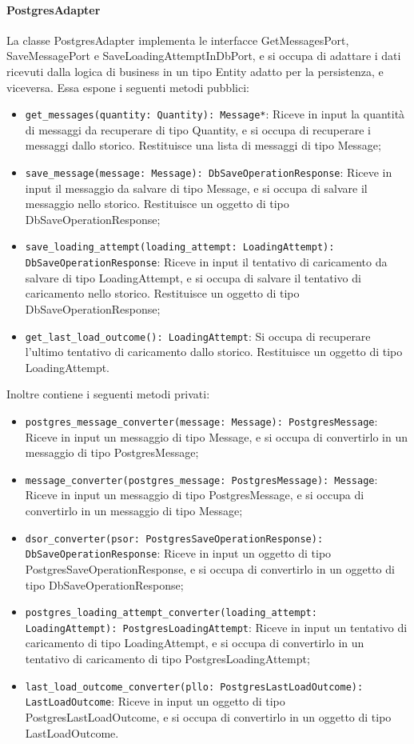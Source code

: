 \paragraph{PostgresAdapter}
\label{sec:postgres_adapter}
La classe PostgresAdapter implementa le interfacce GetMessagesPort, SaveMessagePort e SaveLoadingAttemptInDbPort, e si occupa di adattare i dati ricevuti dalla logica di business in un tipo Entity adatto per la persistenza, e viceversa. Essa espone i seguenti metodi pubblici:
\begin{itemize}
    \item \texttt{get\_messages(quantity: Quantity): Message*}: Riceve in input la quantità di messaggi da recuperare di tipo Quantity, e si occupa di recuperare i messaggi dallo storico. Restituisce una lista di messaggi di tipo Message;
    \item \texttt{save\_message(message: Message): DbSaveOperationResponse}: Riceve in input il messaggio da salvare di tipo Message, e si occupa di salvare il messaggio nello storico. Restituisce un oggetto di tipo DbSaveOperationResponse;
    \item \texttt{save\_loading\_attempt(loading\_attempt: LoadingAttempt): DbSaveOperationResponse}: Riceve in input il tentativo di caricamento da salvare di tipo LoadingAttempt, e si occupa di salvare il tentativo di caricamento nello storico. Restituisce un oggetto di tipo DbSaveOperationResponse;
    \item \texttt{get\_last\_load\_outcome(): LoadingAttempt}: Si occupa di recuperare l'ultimo tentativo di caricamento dallo storico. Restituisce un oggetto di tipo LoadingAttempt.
\end{itemize}
Inoltre contiene i seguenti metodi privati:
\begin{itemize}
    \item \texttt{postgres\_message\_converter(message: Message): PostgresMessage}: Riceve in input un messaggio di tipo Message, e si occupa di convertirlo in un messaggio di tipo PostgresMessage;
    \item \texttt{message\_converter(postgres\_message: PostgresMessage): Message}: Riceve in input un messaggio di tipo PostgresMessage, e si occupa di convertirlo in un messaggio di tipo Message;
    \item \texttt{dsor\_converter(psor: PostgresSaveOperationResponse): DbSaveOperationResponse}: Riceve in input un oggetto di tipo PostgresSaveOperationResponse, e si occupa di convertirlo in un oggetto di tipo DbSaveOperationResponse;
    \item \texttt{postgres\_loading\_attempt\_converter(loading\_attempt: LoadingAttempt): PostgresLoadingAttempt}: Riceve in input un tentativo di caricamento di tipo LoadingAttempt, e si occupa di convertirlo in un tentativo di caricamento di tipo PostgresLoadingAttempt;
    \item \texttt{last\_load\_outcome\_converter(pllo: PostgresLastLoadOutcome): LastLoadOutcome}: Riceve in input un oggetto di tipo PostgresLastLoadOutcome, e si occupa di convertirlo in un oggetto di tipo LastLoadOutcome.
\end{itemize}




